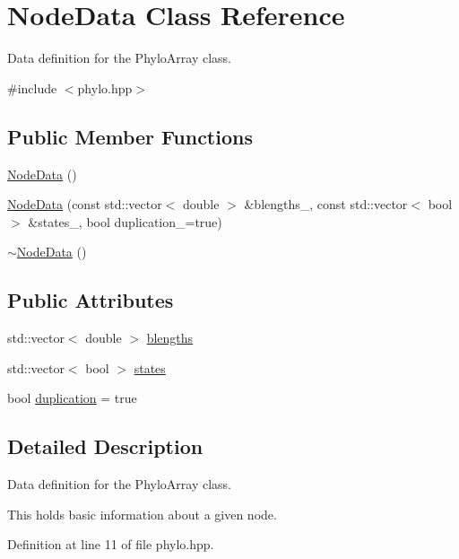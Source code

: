\hypertarget{class_node_data}{}\section{Node\+Data Class Reference}
\label{class_node_data}


Data definition for the {\ttfamily Phylo\+Array} class.  




{\ttfamily \#include $<$phylo.\+hpp$>$}

\subsection*{Public Member Functions}
\begin{DoxyCompactItemize}
\item 
\hyperlink{class_node_data_a56da12a9de7c80c25a905012749c8671}{Node\+Data} ()
\item 
\hyperlink{class_node_data_a0a90191ba4c987afa3406f829967d8e2}{Node\+Data} (const std\+::vector$<$ double $>$ \&blengths\+\_\+, const std\+::vector$<$ bool $>$ \&states\+\_\+, bool duplication\+\_\+=true)
\item 
\hyperlink{class_node_data_ad870d466c40b9be96ad79adccab79038}{$\sim$\+Node\+Data} ()
\end{DoxyCompactItemize}
\subsection*{Public Attributes}
\begin{DoxyCompactItemize}
\item 
std\+::vector$<$ double $>$ \hyperlink{class_node_data_a02da5f097c105813216d87ef89ad7bd4}{blengths}
\item 
std\+::vector$<$ bool $>$ \hyperlink{class_node_data_a33caaadde6afe892624501bdb0edaea6}{states}
\item 
bool \hyperlink{class_node_data_a6c21d52091bb4fa6e3d431856da17caa}{duplication} = true
\end{DoxyCompactItemize}


\subsection{Detailed Description}
Data definition for the {\ttfamily Phylo\+Array} class. 

This holds basic information about a given node. 

Definition at line 11 of file phylo.\+hpp.



